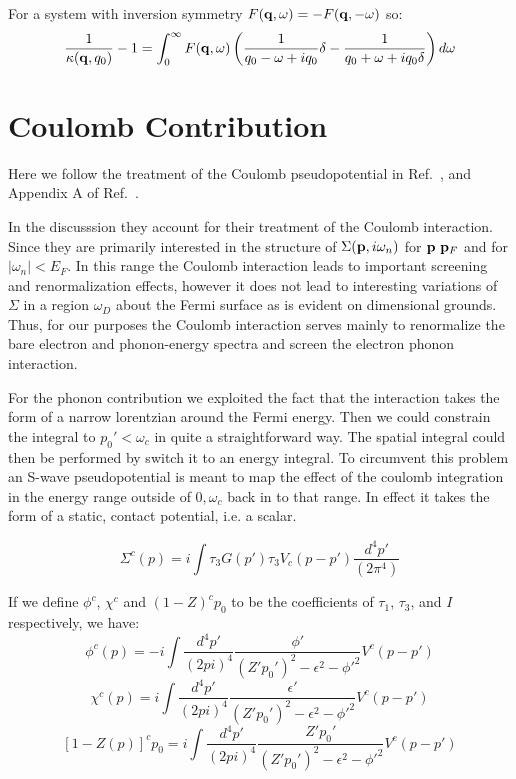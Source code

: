 For a system with inversion symmetry $F({\bf q},\omega) = -F({\bf q}, -\omega)$ so:
%
\begin{equation}
\frac{1}{\kappa({\bf q},q_{0})}-1=\int_{0}^{\infty}F({\bf q},\omega)\left(\frac{1}{q_{0}-\omega+iq_{0}}\delta-\frac{1}{q_{0}+\omega+iq_{0}\delta}\right) d\omega
\end{equation}
%


\section{Coulomb Contribution}
Here we follow the treatment of the Coulomb pseudopotential in
Ref.~\cite{schrieffertext}, and Appendix A of Ref.~\cite{scalpino66}.

In the discusssion  they account for their treatment
of the Coulomb interaction. Since they are primarily interested
in the structure of $\Sigma({\bf p},i\omega_{n})$ for ${\bf p}~{\bf p}_{F}$ 
and for $|\omega_{n}|<E_{F}$. In this range the Coulomb
interaction leads to important screening and renormalization
effects, however it does not lead to interesting
variations of $\Sigma$ in a region $\omega_{D}$ about the Fermi
surface as is evident on dimensional grounds.
Thus, for our purposes the Coulomb interaction serves
mainly to renormalize the bare electron and phonon-energy
spectra and screen the electron phonon interaction.

For the phonon contribution we exploited the fact that the interaction takes the 
form of a narrow lorentzian around the Fermi energy. Then we could constrain the 
integral to $p_0'<\omega_{c}$ in quite a straightforward way. The spatial integral 
could then be performed by switch it to an energy integral. To circumvent this
problem an S-wave pseudopotential is meant to map the effect of the coulomb integration
in the energy range outside of $0,\omega_{c}$ back in to that range. In effect it takes
the form of a static, contact potential, i.e. a scalar. 

\begin{equation}
\Sigma^{c}(p) = i\int\tau_{3}G (p')\tau_{3}V_{c}(p-p') \frac{d^{4}p'}{(2\pi^{4})}
\end{equation}

If we define $\phi^{c}$, $\chi^{c}$ and $(1-Z)^{c}p_{0}$ to be the coefficients
of $\tau_{1}$, $\tau_{3}$, and $I$ respectively, we have:
%
\begin{equation}
\label{eq:phi}
\phi^{c}(p) = -i \int \frac{d^{4}p'}{(2pi)^{4}} \frac{\phi'}{(Z'p_{0}')^{2} -\epsilon^{2} - \phi'^{2}} V^{c}(p-p')
\end{equation}
%
\begin{equation}
\label{eq:chi}
\chi^{c}(p) = i \int \frac{d^{4}p'}{(2pi)^{4}} \frac{\epsilon'}{(Z'p_{0}')^{2} -\epsilon^{2} - \phi'^{2}} V^{c}(p-p')
\end{equation}
%
\begin{equation}
\label{eq:Z}
\left[1 - Z(p)\right]^{c}p_{0} = i \int \frac{d^{4}p'}{(2pi)^{4}} \frac{Z'p_{0}'}{(Z'p_{0}')^{2} -\epsilon^{2} - \phi'^{2}} V^{c}(p-p')
\end{equation}

